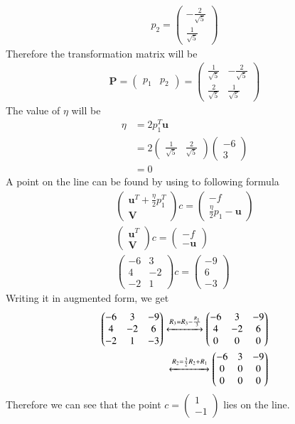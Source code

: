 \documentclass[journal,12pt,twocolumn]{IEEEtran}
\newcommand{\myvec}[1]{\ensuremath{\begin{pmatrix}#1\end{pmatrix}}}
\numberwithin{equation}{subsection}
\let\vec\mathbf
\begin{document}
\begin{align}
    p_2=\myvec{-\frac{2}{\sqrt{5}}\\\frac{1}{\sqrt{5}}}
\end{align}
Therefore the transformation matrix will be
\begin{align}
    \vec{P}=\myvec{p_1&p_2}=\myvec{\frac{1}{\sqrt{5}}&-\frac{2}{\sqrt{5}}\\\frac{2}{\sqrt{5}}&\frac{1}{\sqrt{5}}}
\end{align}
The value of $\eta$ will be
\begin{align}
    \eta&=2p_1^T\vec{u}\\
    &=2\myvec{\frac{1}{\sqrt{5}}&\frac{2}{\sqrt{5}}}\myvec{-6\\3}\\
    &=0
\end{align}
A point on the line can be found by using to following formula
\begin{align}
    \myvec{\vec{u}^T+\frac{\eta}{2}p_1^T\\\vec{V}}c=\myvec{-f\\\frac{\eta}{2}p_1-\vec{u}}\\
    \myvec{\vec{u}^T\\\vec{V}}c=\myvec{-f\\-\vec{u}}\\
    \myvec{-6&3\\4&-2\\-2&1}c=\myvec{-9\\6\\-3}
\end{align}
Writing it in augmented form, we get
\begin{align}
    \myvec{-6&3&-9\\4&-2&6\\-2&1&-3}\xleftrightarrow{R_3=R_3-\frac{R_1}{3}}\myvec{-6&3&-9\\4&-2&6\\0&0&0}\\
    \xleftrightarrow{R_2=\frac{3}{2}R_2+R_1}\myvec{-6&3&-9\\0&0&0\\0&0&0}
\end{align}
Therefore we can see that the point $c=\myvec{1\\-1}$ lies on the line.
\end{document}
